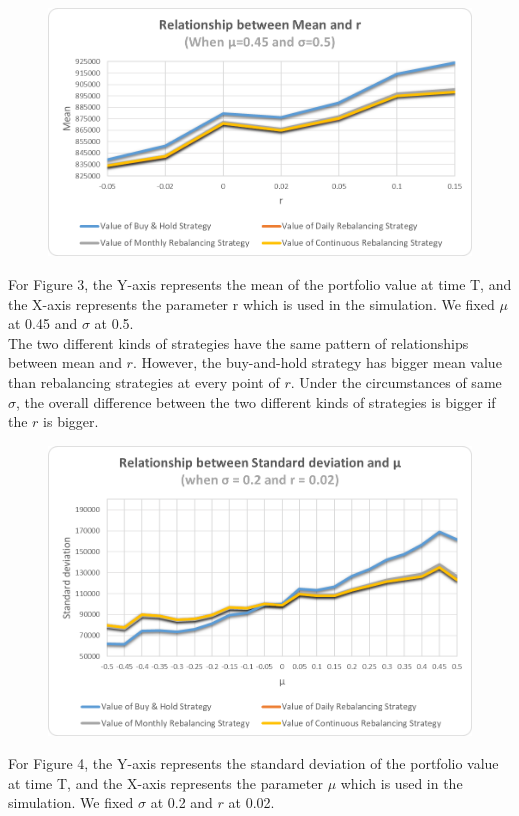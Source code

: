 \documentclass[
10pt, %
a4paper, %
oneside, %
headinclude,footinclude, %
BCOR5mm, %
]{scrartcl}
\begin{document}
\begin{figure}[H]
	\centering
	\includegraphics[width=0.7\linewidth]{mean_r_045_050}
	\caption{}
	\label{fig:meanr045050}
\end{figure}

For Figure 3, the Y-axis represents the mean of the portfolio value at time T, and the X-axis represents the parameter r which is used in the simulation. We fixed $\mu$ at 0.45 and $\sigma$ at 0.5.\\

The two different kinds of strategies have the same pattern of relationships between mean and $r$. However, the buy-and-hold strategy has bigger mean value than rebalancing strategies at every point of $r$. Under the circumstances of same $\sigma$, the overall difference between the two different kinds of strategies is bigger if the $r$ is bigger. \\



\begin{figure}[H]
	\centering
	\includegraphics[width=0.7\linewidth]{std_mu_020_002}
	\caption{}
	\label{fig:stdmu020002}
\end{figure}
For Figure 4, the Y-axis represents the standard deviation of the portfolio value at time T, and the X-axis represents the parameter $\mu$ which is used in the simulation. We fixed $\sigma$ at 0.2 and $r$ at 0.02.\\
\end{document}
